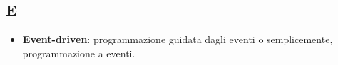 \subsection{E}

\begin{itemize}
\item \textbf{Event-driven}: programmazione guidata dagli eventi o semplicemente, programmazione a eventi.
\end{itemize}

